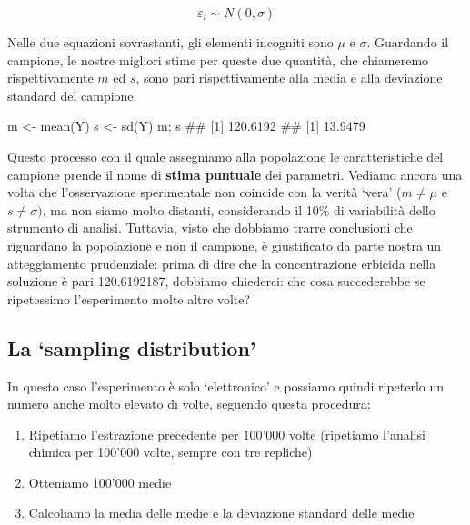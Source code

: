 \documentclass[a4paper,12pt,oneside]{book}
\providecommand{\tightlist}{%
  \setlength{\itemsep}{0pt}\setlength{\parskip}{0pt}}
\newenvironment{Shaded}{\begin{snugshade}}{\end{snugshade}}
\newcommand{\DocumentationTok}[1]{#1}
\newcommand{\OtherTok}[1]{#1}
\newcommand{\FunctionTok}[1]{#1}
\newcommand{\NormalTok}[1]{#1}
\begin{document}
\[\varepsilon_i \sim N(0, \sigma)\]

Nelle due equazioni sovrastanti, gli elementi incogniti sono \(\mu\) e \(\sigma\). Guardando il campione, le nostre migliori stime per queste due quantità, che chiameremo rispettivamente \(m\) ed \(s\), sono pari rispettivamente alla media e alla deviazione standard del campione.

\begin{Shaded}
\begin{Highlighting}[]
\NormalTok{m }\OtherTok{\textless{}{-}} \FunctionTok{mean}\NormalTok{(Y)}
\NormalTok{s }\OtherTok{\textless{}{-}} \FunctionTok{sd}\NormalTok{(Y)}
\NormalTok{m; s}
\DocumentationTok{\#\# [1] 120.6192}
\DocumentationTok{\#\# [1] 13.9479}
\end{Highlighting}
\end{Shaded}

Questo processo con il quale assegniamo alla popolazione le caratteristiche del campione prende il nome di \textbf{stima puntuale} dei parametri. Vediamo ancora una volta che l'osservazione sperimentale non coincide con la verità `vera' (\(m \neq \mu\) e \(s \neq \sigma)\), ma non siamo molto distanti, considerando il 10\% di variabilità dello strumento di analisi. Tuttavia, visto che dobbiamo trarre conclusioni che riguardano la popolazione e non il campione, è giustificato da parte nostra un atteggiamento prudenziale: prima di dire che la concentrazione erbicida nella soluzione è pari 120.6192187, dobbiamo chiederci: che cosa succederebbe se ripetessimo l'esperimento molte altre volte?

\hypertarget{la-sampling-distribution}{%
\subsection{La `sampling distribution'}\label{la-sampling-distribution}}

In questo caso l'esperimento è solo `elettronico' e possiamo quindi ripeterlo un numero anche molto elevato di volte, seguendo questa procedura:

\begin{enumerate}
\def\labelenumi{\arabic{enumi}.}
\tightlist
\item
  Ripetiamo l'estrazione precedente per 100'000 volte (ripetiamo l'analisi chimica per 100'000 volte, sempre con tre repliche)
\item
  Otteniamo 100'000 medie
\item
  Calcoliamo la media delle medie e la deviazione standard delle medie
\end{enumerate}
\end{document}
